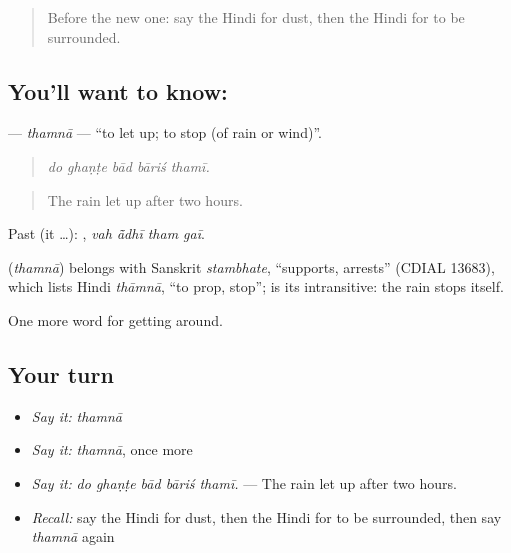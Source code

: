 \label{lesson:HI-C440-thamnaintr}



\begin{quote}
Before the new one: say the Hindi for dust, then the Hindi for to be surrounded.
\end{quote}

\subsection*{You'll want to know: }
\textbf{} — \emph{thamnā} — \textquotedblleft{}to let up; to stop (of rain or wind)\textquotedblright{}.

\begin{quote}
    
\end{quote}

\begin{quote}
\emph{do ghaṇṭe bād bāriś thamī.}
\end{quote}

\begin{quote}
The rain let up after two hours.
\end{quote}

Past (it …):    , \emph{vah ā̃dhī tham gaī}.

\begin{cousinweb}
\textbf{} (\emph{thamnā}) belongs with Sanskrit \emph{stambhate}, \textquotedblleft{}supports, arrests\textquotedblright{} (CDIAL 13683), which lists Hindi \emph{thāmnā}, \textquotedblleft{}to prop, stop\textquotedblright{};  is its intransitive: the rain stops itself.
\end{cousinweb}

\begin{grammarlens}[title={What you've built}]
One more word for getting around.
\end{grammarlens}

\subsection*{Your turn}
\begin{itemize}
\raggedright
  \item \emph{Say it:} \emph{thamnā}
  \item \emph{Say it:} \emph{thamnā}, once more
  \item \emph{Say it:} \emph{do ghaṇṭe bād bāriś thamī.} — The rain let up after two hours.
  \item \emph{Recall:} say the Hindi for dust, then the Hindi for to be surrounded, then say \emph{thamnā} again
\end{itemize}


